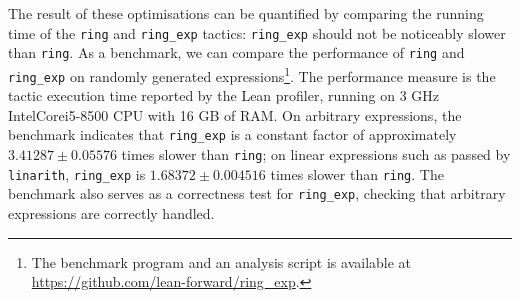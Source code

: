 \documentclass{llncs}
\newcommand{\lean}[1]{\texttt{#1}\xspace} %
\newcommand{\ring}{\lean{ring}}
\newcommand{\ringexp}{\lean{ring\_exp}}
\begin{document}
The result of these optimisations can be quantified by comparing the running time
of the \lean{ring} and \ringexp tactics: \ringexp should not be noticeably slower than \lean{ring}.
As a benchmark, we can compare the performance of \ring and \ringexp on randomly generated expressions\footnote{The benchmark program and an analysis script is available at \url{https://github.com/lean-forward/ring_exp}.}.
The performance measure is the tactic execution time reported by the Lean profiler,
running on 3 GHz Intel\textregistered Core\texttrademark i5-8500 CPU with 16 GB of RAM.
On arbitrary expressions, the benchmark indicates that \ringexp is a constant factor of approximately $3.41287 \pm 0.05576$ times slower than \ring;
on linear expressions such as passed by \lean{linarith}, 
\ringexp is $1.68372 \pm 0.004516$ times slower than \ring.
The benchmark also serves as a correctness test for \ringexp, checking that arbitrary expressions are correctly handled.

% 

%
%

\end{document}
